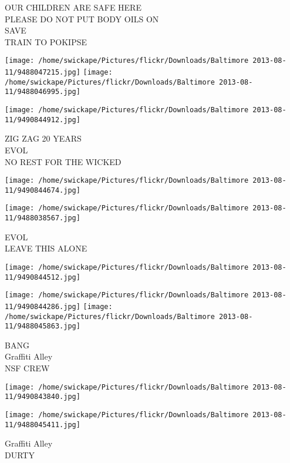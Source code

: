 \documentclass[10pt,letterpaper]{article}
\begin{document}
OUR CHILDREN ARE SAFE HERE\\
PLEASE DO NOT PUT BODY OILS ON\\
SAVE\\
TRAIN TO POKIPSE\\
\pagebreak

\texttt{[image: /home/swickape/Pictures/flickr/Downloads/Baltimore 2013-08-11/9488047215.jpg]}
\texttt{[image: /home/swickape/Pictures/flickr/Downloads/Baltimore 2013-08-11/9488046995.jpg]}

\vspace{0.25in}
\texttt{[image: /home/swickape/Pictures/flickr/Downloads/Baltimore 2013-08-11/9490844912.jpg]}

ZIG ZAG 20 YEARS\\
EVOL\\
NO REST FOR THE WICKED\\
\pagebreak

\texttt{[image: /home/swickape/Pictures/flickr/Downloads/Baltimore 2013-08-11/9490844674.jpg]}

\vspace{0.25in}
\texttt{[image: /home/swickape/Pictures/flickr/Downloads/Baltimore 2013-08-11/9488038567.jpg]}

EVOL\\
LEAVE THIS ALONE\\
\pagebreak

\texttt{[image: /home/swickape/Pictures/flickr/Downloads/Baltimore 2013-08-11/9490844512.jpg]}

\vspace{0.25in}
\texttt{[image: /home/swickape/Pictures/flickr/Downloads/Baltimore 2013-08-11/9490844286.jpg]}
\texttt{[image: /home/swickape/Pictures/flickr/Downloads/Baltimore 2013-08-11/9488045863.jpg]}

BANG\\
Graffiti Alley\\
NSF CREW\\
\pagebreak

\texttt{[image: /home/swickape/Pictures/flickr/Downloads/Baltimore 2013-08-11/9490843840.jpg]}

\vspace{0.25in}
\texttt{[image: /home/swickape/Pictures/flickr/Downloads/Baltimore 2013-08-11/9488045411.jpg]}

Graffiti Alley\\
DURTY\\
\pagebreak
\end{document}
